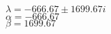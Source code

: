 \documentclass[preview]{standalone}
\begin{document}
\begin{center}
$\lambda = -666.67 \pm 1699.67i$ \\
                $\alpha = -666.67$ \\
                $\beta = 1699.67$ \\
\end{center}
\end{document}
